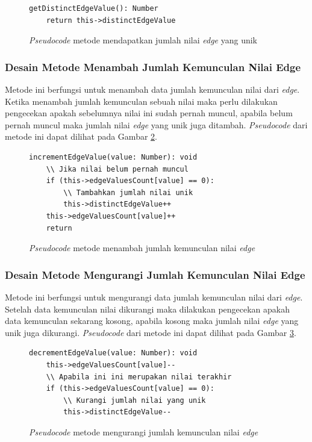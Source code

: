 \begin{figure}[ht]
	\begin{lstlisting}[firstnumber=0]
	getDistinctEdgeValue(): Number
	return this->distinctEdgeValue
	\end{lstlisting}
	\caption{\textit{Pseudocode} metode mendapatkan jumlah nilai \textit{edge} yang unik}
	\label{psdo:tree_getDistinctEdgeValue}
\end{figure}

\subsubsection{Desain Metode Menambah Jumlah Kemunculan Nilai Edge}
Metode ini berfungsi untuk menambah data jumlah kemunculan nilai dari \textit{edge}. Ketika menambah jumlah kemunculan sebuah nilai maka perlu dilakukan pengecekan apakah sebelumnya nilai ini sudah pernah muncul, apabila belum pernah muncul maka jumlah nilai \textit{edge} yang unik juga ditambah. \textit{Pseudocode} dari metode ini dapat dilihat pada Gambar \ref{psdo:tree_incrementEdgeValue}.

\begin{figure}[ht]
	\begin{lstlisting}[firstnumber=0]
	incrementEdgeValue(value: Number): void
	\\ Jika nilai belum pernah muncul
	if (this->edgeValuesCount[value] == 0):
		\\ Tambahkan jumlah nilai unik
		this->distinctEdgeValue++
	this->edgeValuesCount[value]++
	return
	\end{lstlisting}
	\caption{\textit{Pseudocode} metode menambah jumlah kemunculan nilai \textit{edge}}
	\label{psdo:tree_incrementEdgeValue}
\end{figure}

\subsubsection{Desain Metode Mengurangi Jumlah Kemunculan Nilai Edge}
Metode ini berfungsi untuk mengurangi data jumlah kemunculan nilai dari \textit{edge}. Setelah data kemunculan nilai dikurangi maka dilakukan pengecekan apakah data kemunculan sekarang kosong, apabila kosong maka jumlah nilai \textit{edge} yang unik juga dikurangi. \textit{Pseudocode} dari metode ini dapat dilihat pada Gambar \ref{psdo:tree_decrementEdgeValue}.

\begin{figure}[ht]
	\begin{lstlisting}[firstnumber=0]
	decrementEdgeValue(value: Number): void
	this->edgeValuesCount[value]--
	\\ Apabila ini ini merupakan nilai terakhir
	if (this->edgeValuesCount[value] == 0):
		\\ Kurangi jumlah nilai yang unik
		this->distinctEdgeValue--
	\end{lstlisting}
	\caption{\textit{Pseudocode} metode mengurangi jumlah kemunculan nilai \textit{edge}}
	\label{psdo:tree_decrementEdgeValue}
\end{figure}

